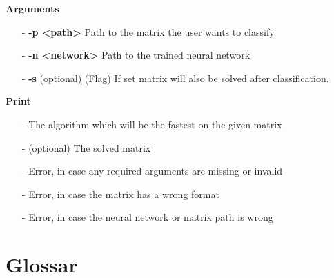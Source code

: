 \documentclass[parskip=full]{scrartcl}
\begin{document}
\begin{itemize}
\textbf{Arguments}
	\begin{itemize}
	\item[-]\textbf{-p <path>} Path to the matrix the user wants to classify
	\item[-]\textbf{-n <network>} Path to the trained neural network
	\item[-]\textbf{-s} (optional) (Flag) If set matrix will also be solved after classification.
	\end{itemize}

\textbf{Print}
	\begin{itemize}
	\item[-]The algorithm which will be the fastest on the given matrix
	\item[-](optional) The solved matrix
	\item[-]Error, in case any required arguments are missing or invalid
	\item[-]Error, in case the matrix has a wrong format
	\item[-]Error, in case the neural network or matrix path is wrong
	\end{itemize}
\end{itemize}



\clearpage

\section{Glossar}

%
\printnoidxglossaries
\end{document}
